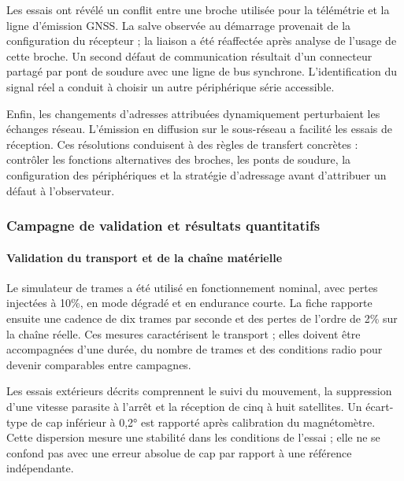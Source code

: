 Les essais ont révélé un conflit entre une broche utilisée pour la télémétrie et la ligne d'émission GNSS. La salve observée au démarrage provenait de la configuration du récepteur ; la liaison a été réaffectée après analyse de l'usage de cette broche. Un second défaut de communication résultait d'un connecteur partagé par pont de soudure avec une ligne de bus synchrone. L'identification du signal réel a conduit à choisir un autre périphérique série accessible.

Enfin, les changements d'adresses attribuées dynamiquement perturbaient les échanges réseau. L'émission en diffusion sur le sous-réseau a facilité les essais de réception. Ces résolutions conduisent à des règles de transfert concrètes : contrôler les fonctions alternatives des broches, les ponts de soudure, la configuration des périphériques et la stratégie d'adressage avant d'attribuer un défaut à l'observateur.

\subsubsection{Campagne de validation et résultats quantitatifs}

\paragraph{Validation du transport et de la chaîne matérielle}
Le simulateur de trames a été utilisé en fonctionnement nominal, avec pertes injectées à 10\%, en mode dégradé et en endurance courte. La fiche rapporte ensuite une cadence de dix trames par seconde et des pertes de l'ordre de 2\% sur la chaîne réelle. Ces mesures caractérisent le transport ; elles doivent être accompagnées d'une durée, du nombre de trames et des conditions radio pour devenir comparables entre campagnes.


Les essais extérieurs décrits comprennent le suivi du mouvement, la suppression d'une vitesse parasite à l'arrêt et la réception de cinq à huit satellites. Un écart-type de cap inférieur à 0,2° est rapporté après calibration du magnétomètre. Cette dispersion mesure une stabilité dans les conditions de l'essai ; elle ne se confond pas avec une erreur absolue de cap par rapport à une référence indépendante.


